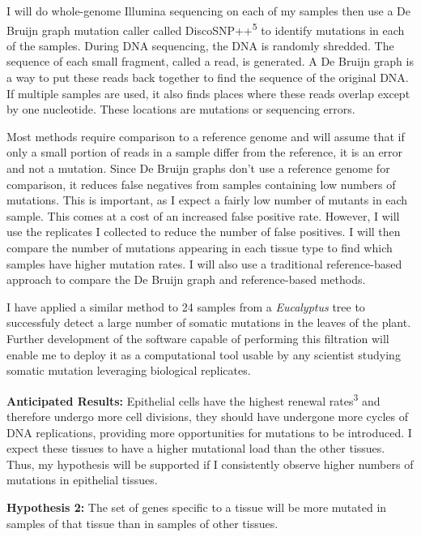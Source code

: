 \documentclass[12pt]{article}
\begin{document}
I will do whole-genome Illumina sequencing on each of my samples then use a De Bruijn graph mutation caller called DiscoSNP++\textsuperscript{5} to identify mutations in each of the samples. During DNA sequencing, the DNA is randomly shredded. The sequence of each small fragment, called a read, is generated. A De Bruijn graph is a way to put these reads back together to find the sequence of the original DNA. If multiple samples are used, it also finds places where these reads overlap except by one nucleotide. These locations are mutations or sequencing errors.

Most methods require comparison to a reference genome and will assume that if only a small portion of reads in a sample differ from the reference, it is an error and not a mutation. Since De Bruijn graphs don't use a reference genome for comparison, it reduces false negatives from samples containing low numbers of mutations. This is important, as I expect a fairly low number of mutants in each sample. This comes at a cost of an increased false positive rate. However, I will use the replicates I collected to reduce the number of false positives. I will then compare the number of mutations appearing in each tissue type to find which samples have higher mutation rates. I will also use a traditional reference-based approach to compare the De Bruijn graph and reference-based methods. %

I have applied a similar method to 24 samples from a \textit{Eucalyptus} tree to successfuly detect a large number of somatic mutations in the leaves of the plant. Further development of the software capable of performing this filtration will enable me to deploy it as a computational tool usable by any scientist studying somatic mutation leveraging biological replicates.

\textbf{Anticipated Results:}
Epithelial cells have the highest renewal rates\textsuperscript{3} and therefore undergo more cell divisions, they should have undergone more cycles of DNA replications, providing more opportunities for mutations to be introduced.
I expect these tissues to have a higher mutational load than the other tissues.
Thus, my hypothesis will be supported if I consistently observe higher numbers of mutations in epithelial tissues.

\textbf{Hypothesis 2:}
The set of genes specific to a tissue will be more mutated in samples of that tissue than in samples of other tissues.
\end{document}
